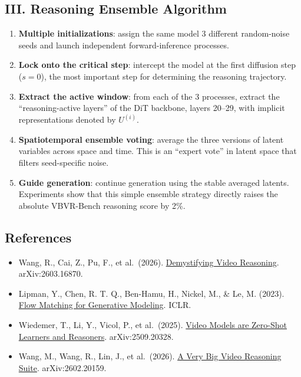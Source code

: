 \hypertarget{iii.-reasoning-ensemble-algorithm}{%
\subsection{III. Reasoning Ensemble Algorithm}\label{iii.-reasoning-ensemble-algorithm}}

\begin{enumerate}
\def\labelenumi{\arabic{enumi}.}
\tightlist
\item
  \textbf{Multiple initializations}: assign the same model 3 different random-noise seeds and launch independent forward-inference processes.
\item
  \textbf{Lock onto the critical step}: intercept the model at the first diffusion step (\(s=0\)), the most important step for determining the reasoning trajectory.
\item
  \textbf{Extract the active window}: from each of the 3 processes, extract the ``reasoning-active layers'' of the DiT backbone, layers 20--29, with implicit representations denoted by \(U^{(i)}\).
\item
  \textbf{Spatiotemporal ensemble voting}: average the three versions of latent variables across space and time. This is an ``expert vote'' in latent space that filters seed-specific noise.
\item
  \textbf{Guide generation}: continue generation using the stable averaged latents. Experiments show that this simple ensemble strategy directly raises the absolute VBVR-Bench reasoning score by 2\%.
\end{enumerate}

\FloatBarrier
{}
\hypertarget{references-145}{%
\subsection{References}\label{references-145}}

\vspace{0.25em}
\begin{itemize}
\tightlist
\item
  Wang, R., Cai, Z., Pu, F., et al.~(2026). \href{https://arxiv.org/abs/2603.16870}{Demystifying Video Reasoning}. arXiv:2603.16870.
\item
  Lipman, Y., Chen, R. T. Q., Ben-Hamu, H., Nickel, M., \& Le, M. (2023). \href{https://arxiv.org/abs/2210.02747}{Flow Matching for Generative Modeling}. ICLR.
\item
  Wiedemer, T., Li, Y., Vicol, P., et al.~(2025). \href{https://arxiv.org/abs/2509.20328}{Video Models are Zero-Shot Learners and Reasoners}. arXiv:2509.20328.
\item
  Wang, M., Wang, R., Lin, J., et al.~(2026). \href{https://arxiv.org/abs/2602.20159}{A Very Big Video Reasoning Suite}. arXiv:2602.20159.
\end{itemize}

\clearpage
